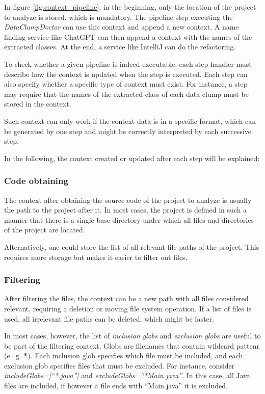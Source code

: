 In figure \ref{fig:context_pipeline}, in the beginning, only the location of the project to analyze is stored, which is mandatory. The pipeline step executing the \textit{DataClumpDoctor} can use this context and append a new context. A name finding service like ChatGPT can then append a context with the names of the extracted classes. At the end, a service like IntelliJ can do the refactoring.



To check whether a given pipeline is indeed executable, each step handler must describe how the context is updated when the step is executed. Each step can also specify whether a specific type of context must exist. For instance, a step may require that the names of the extracted class of each data clump must be stored in the context.  

Such context can only work if the context data is in a specific format, which can be generated by one step and might be correctly interpreted by each successive step. 

In the following, the context created or updated after each step will be explained:

\subsubsection{Code obtaining}
The context after obtaining the source code of the project to analyze is usually the path to the project after it. In most cases, the project is defined in such a manner that there is a single base directory under which all files and directories of the project are located.

Alternatively, one could store the list of all relevant file paths of the project. This requires more storage but makes it easier to filter out files. 

\subsubsection{Filtering}
After filtering the files, the context can be a new path with all files considered relevant, requiring a deletion or moving file system operation. If a list of files is used, all irrelevant file paths can be deleted, which might be faster.

In most cases, however, the list of \textit{inclusion globs} and \textit{exclusion globs} are useful to be part of the filtering context. Globs are filenames that contain wildcard pattenr (e.~g. \textbf{*}). Each inclusion glob specifies which file must be included, and each exclusion glob specifies files that must be excluded. For instance, consider \textit{includeGlobs=[\enquote{*.java}]} and \textit{excludeGlobs=\enquote{*Main.java}}. In this case, all Java files are included, if however a file ends with \enquote{Main.java} it is excluded.

